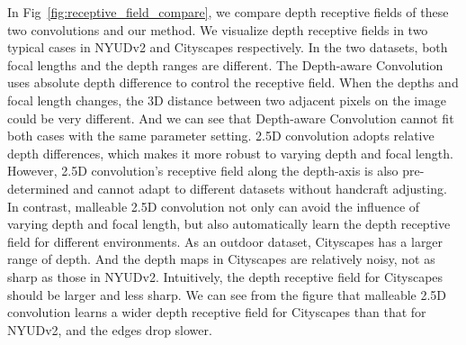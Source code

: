 \documentclass[runningheads]{llncs}
\begin{document}
In Fig~\ref{fig:receptive_field_compare}, we compare depth receptive fields of these two convolutions and our method.
We visualize depth receptive fields in two typical cases in NYUDv2 and Cityscapes respectively.
In the two datasets, both focal lengths and the depth ranges are different.
The Depth-aware Convolution uses absolute depth difference to control the receptive field.
When the depths and focal length changes, the 3D distance between two adjacent pixels on the image could be very different.
And we can see that Depth-aware Convolution cannot fit both cases with the same parameter setting.
2.5D convolution adopts relative depth differences, which makes it more robust to varying depth and focal length.
However, 2.5D convolution's receptive field along the depth-axis is also pre-determined and cannot adapt to different datasets without handcraft adjusting.
In contrast, malleable 2.5D convolution not only can avoid the influence of varying depth and focal length, but also automatically learn the depth receptive field for different environments.
As an outdoor dataset, Cityscapes has a larger range of depth.
And the depth maps in Cityscapes are relatively noisy, not as sharp as those in NYUDv2.
Intuitively, the depth receptive field for Cityscapes should be larger and less sharp.
We can see from the figure that malleable 2.5D convolution learns a wider depth receptive field for Cityscapes than that for NYUDv2, and the edges drop slower.
\end{document}
